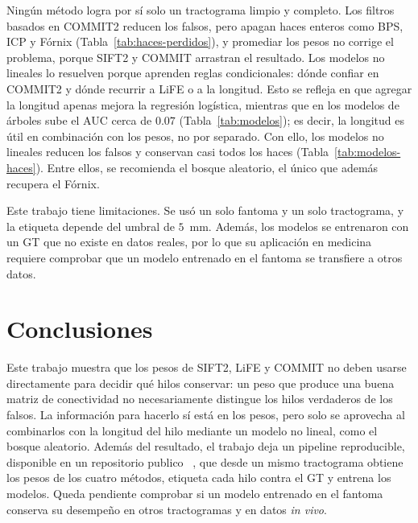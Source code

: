 \documentclass[11pt,a4paper]{article}
\begin{document}
Ningún método logra por sí solo un tractograma limpio y completo. Los filtros basados en COMMIT2 reducen los falsos, pero apagan haces enteros como BPS, ICP y Fórnix (Tabla~\ref{tab:haces-perdidos}), y promediar los pesos no corrige el problema, porque SIFT2 y COMMIT arrastran el resultado. Los modelos no lineales lo resuelven porque aprenden reglas condicionales: dónde confiar en COMMIT2 y dónde recurrir a LiFE o a la longitud. Esto se refleja en que agregar la longitud apenas mejora la regresión logística, mientras que en los modelos de árboles sube el AUC cerca de $0.07$ (Tabla~\ref{tab:modelos}); es decir, la longitud es útil en combinación con los pesos, no por separado. Con ello, los modelos no lineales reducen los falsos y conservan casi todos los haces (Tabla~\ref{tab:modelos-haces}). Entre ellos, se recomienda el bosque aleatorio, el único que además recupera el Fórnix.

Este trabajo tiene limitaciones. Se usó un solo fantoma y un solo tractograma, y la etiqueta depende del umbral de $5$~mm. Además, los modelos se entrenaron con un GT que no existe en datos reales, por lo que su aplicación en medicina requiere comprobar que un modelo entrenado en el fantoma se transfiere a otros datos.

\section{Conclusiones}
Este trabajo muestra que los pesos de SIFT2, LiFE y COMMIT no deben usarse directamente para decidir qué hilos conservar: un peso que produce una buena matriz de conectividad no necesariamente distingue los hilos verdaderos de los falsos. La información para hacerlo sí está en los pesos, pero solo se aprovecha al combinarlos con la longitud del hilo mediante un modelo no lineal, como el bosque aleatorio. 
Además del resultado, el trabajo deja un pipeline reproducible, disponible en un repositorio publico ~\cite{repositorio}, que desde un mismo tractograma obtiene los pesos de los cuatro métodos, etiqueta cada hilo contra el GT y entrena los modelos.
Queda pendiente comprobar si un modelo entrenado en el fantoma conserva su desempeño en otros tractogramas y en datos \textit{in vivo}.


\end{document}
